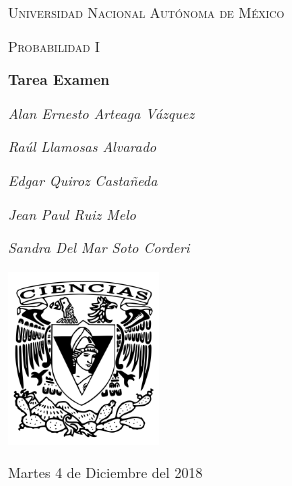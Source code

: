 \documentclass[11pt,a4paper]{report}
\begin{document}
	\begin{titlepage}
		\centering
		{\scshape\LARGE Universidad Nacional Autónoma de México \par}
		\vspace{1cm}
		{\scshape\Large Probabilidad I\par}
		\vspace{1.5cm}
		{\huge\bfseries Tarea Examen\par}
		\vspace{.5cm}

		{\Large\itshape Alan Ernesto Arteaga Vázquez \par}
		 \vspace{.5cm}
		{\Large\itshape Raúl Llamosas Alvarado \par}
		 \vspace{.5cm}
		{\Large\itshape Edgar Quiroz Castañeda \par}
	    \vspace{.5cm}
		{\Large\itshape Jean Paul Ruiz Melo\par}
		\vspace{.5cm}
		{\Large\itshape Sandra Del Mar Soto Corderi \par}

		\vfill
		 \includegraphics[width=0.3\textwidth]{escudo.png}
		\vfill

		{\large Martes 4 de Diciembre del 2018 \par}
	\end{titlepage}

	\pagebreak
	\setlength{\voffset}{-0.75in}
	\setlength{\headsep}{5pt}
\end{document}
